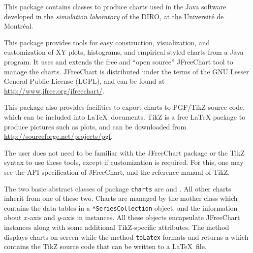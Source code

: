 \latex{\label {sec:overview}}

\begin {htmlonly}
This package contains classes to produce charts used in the Java software developed in the {\em simulation laboratory\/}
of the DIRO, at the Universit\'e de Montr\'eal.
\end {htmlonly}

This package provides tools for easy
construction, visualization, and customization
of XY plots, histograms, and empirical styled charts
from a Java program.
It uses and extends the free and ``open source''
JFreeChart tool to manage the
charts. JFreeChart is
distributed under the terms of the GNU Lesser General Public License
(LGPL), and can be found at \url{http://www.jfree.org/jfreechart/}.

This package also provides facilities
to export charts to PGF/TikZ source code, which can be included into
\LaTeX\ documents. TikZ is a free \LaTeX{}
package to produce pictures such as plots, and can be downloaded from
\url{http://sourceforge.net/projects/pgf}.

The user does not need to be familiar with the JFreeChart package
or the TikZ syntax to
use these tools, except if customization is required.
For this, one may see the API specification of JFreeChart, and
the reference manual of TikZ.

The two basic abstract classes of package \texttt{charts} are
 and
. All other
charts inherit from one of these two. Charts are managed by
the mother class which contains the data tables in a
\texttt{*SeriesCollection} object, and the
information about $x$-axis and $y$-axis in
 instances.
All these objects encapsulate JFreeChart instances along with some
additional TikZ-specific attributes.
The method
displays charts on screen while the method
\texttt{toLatex} formats and returns a
 which contains the TikZ source
code that can be written to a \LaTeX\ file.

